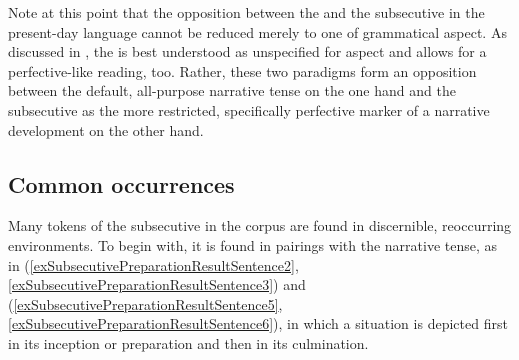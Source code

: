 Note at this point that the opposition between the  and the subsecutive in the present-day language cannot be reduced merely to one of grammatical aspect. As discussed in , the  is best understood as unspecified for aspect and allows for a perfective-like reading, too. Rather, these two paradigms form an opposition between the default, all-purpose narrative tense on the one hand and the subsecutive as the more restricted, specifically perfective marker of a narrative development on the other hand.

\subsection{Common occurrences}
\label{SubsecutiveCommon}
Many tokens of the subsecutive in the corpus are found in discernible, reoccurring environments. To begin with, it is found in pairings with the narrative tense, as in (\ref{exSubsecutivePreparationResultSentence2}, \ref{exSubsecutivePreparationResultSentence3}) and (\ref{exSubsecutivePreparationResultSentence5}, \ref{exSubsecutivePreparationResultSentence6}), in which a situation is depicted first in its inception or preparation and then in its culmination.


